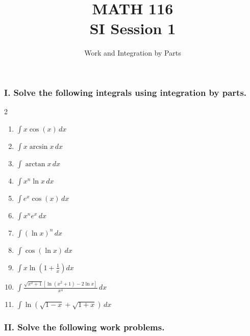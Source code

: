 \documentclass[12pt]{article}
\begin{document}

\title{MATH 116 \\ SI Session 1}
\author{Work and Integration by Parts}

\maketitle


\subsubsection*{I. Solve the following integrals using integration by parts.}

\begin{multicols}{2}
\begin{enumerate}
    \item $\displaystyle \int x\cos(x) \, dx$
    \item $\displaystyle \int x\arcsin{x} \, dx$
    \item $\displaystyle \int \arctan{x} \, dx$
    \item $\displaystyle \int x^n\ln{x} \, dx$
    \item $\displaystyle \int e^x\cos(x) \, dx$
    \item $\displaystyle \int x^n e^{x} \, dx$
    \item $\displaystyle \int (\ln{x})^n \, dx$
    \item $\displaystyle \int \cos{(\ln{x})} \, dx$
    \item $\displaystyle \int x\ln\left(1+\frac{1}{x}\right) dx$
    \item $\displaystyle \int \frac{\sqrt{x^2+1}  [\ln{(x^2+1)}-2\ln x]}{x^4} \, dx$
    \item $\displaystyle \int \ln{(\sqrt{1-x}+\sqrt{1+x})} \, dx$


\end{enumerate}
\end{multicols}
\subsubsection*{II. Solve the following work problems.}
\end{document}
